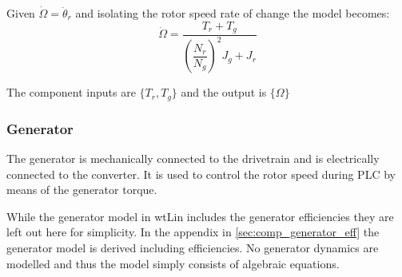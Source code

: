 Given $ \dot{\Omega} = \ddot{\theta}_r $ and isolating the rotor speed rate of change the model becomes:
\begin{equation}\label{key}
	 \dot{\Omega} = \dfrac{T_{r} + T_{g}}{\left(\dfrac{N_r}{N_g}\right)^2 J_{g} + J_{r}}
\end{equation}

The component inputs are $ \{T_r, T_g\} $ and the output is $ \{\Omega\} $ 



\subsubsection{Generator} \label{sec:comp_generator}
The generator is mechanically connected to the drivetrain and is electrically connected to the converter. It is used to control the rotor speed during PLC by means of the generator torque. 

While the generator model in wtLin includes the generator efficiencies they are left out here for simplicity. In the appendix in \cref{sec:comp_generator_eff} the generator model is derived including efficiencies. No generator dynamics are modelled and thus the model simply consists of algebraic equations.

